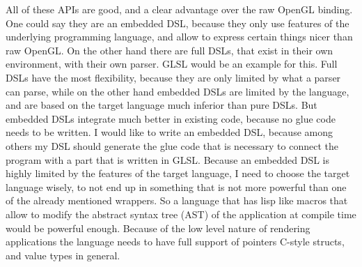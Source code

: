 \documentclass[10pt]{report}
\begin{document}
All of these APIs are good, and a clear advantage over the raw OpenGL binding. One could say they are an embedded DSL, because they only use features of the underlying programming language, and allow to express certain things nicer than raw OpenGL. On the other hand there are full DSLs, that exist in their own environment, with their own parser. GLSL would be an example for this. Full DSLs have the most flexibility, because they are only limited by what a parser can parse, while on the other hand embedded DSLs are limited by the language, and are based on the target language much inferior than pure DSLs. But embedded DSLs integrate much better in existing code, because no glue code needs to be written. I would like to write an embedded DSL, because among others my DSL should generate the glue code that is necessary to connect the program with a part that is written in GLSL. Because an embedded DSL is highly limited by the features of the target language, I need to choose the target language wisely, to not end up in something that is not more powerful than one of the already mentioned wrappers. So a language that has lisp like macros that allow to modify the abstract syntax tree (AST) of the application at compile time would be powerful enough. Because of the low level nature of rendering applications the language needs to have full support of pointers C-style structs, and value types in general.
\end{document}
